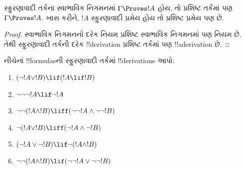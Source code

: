 \documentclass[../../../include/open-logic-section]{subfiles}
\begin{document}
\begin{prop}
  સ્ફુરણાવાદી તર્કના સ્વાભાવિક નિગમનમાં $\Gamma \Proves !A$
  હોય, તો પ્રશિષ્ટ તર્કમાં પણ $\Gamma \Proves !A$. ખાસ કરીને,
  $!A$ સ્ફુરણાવાદી પ્રમેય હોય તો પ્રશિષ્ટ પ્રમેય પણ છે.
\end{prop}

\begin{proof}
  સ્વાભાવિક નિગમનનો દરેક નિયમ પ્રશિષ્ટ સ્વાભાવિક નિગમનમાં
  પણ નિયમ છે. તેથી સ્ફુરણાવાદી તર્કની દરેક !!{derivation}
  પ્રશિષ્ટ તર્કમાં પણ !!a{derivation} છે.
\end{proof}

\begin{prob}
  નીચેનાં !!{formula}sની સ્ફુરણાવાદી તર્કમાં
  !!{derivation}s આપો:
  \begin{enumerate}
    \item $(\lnot !A \lor !B) \lif (!A \lif !B)$
    \item $\lnot\lnot\lnot !A \lif \lnot !A$
    \item $\lnot\lnot (!A \land !B) \liff (\lnot\lnot !A\land \lnot \lnot !B)$
    \item $\lnot (!A \lor !B) \liff (\lnot !A \land \lnot !B)$
    \item $(\lnot !A \lor \lnot !B) \lif \lnot (!A \land !B)$
    \item $\lnot\lnot ( !A \land !B) \lif  (\lnot\lnot !A \lor
    \lnot\lnot !B)$
  \end{enumerate}
\end{prob}
\end{document}
